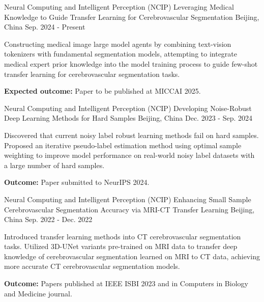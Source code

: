 

\begin{cventries}

  \cventry
  {Neural Computing and Intelligent Perception (NCIP)}
  {Leveraging Medical Knowledge to Guide Transfer Learning for Cerebrovascular Segmentation}
  {Beijing, China}
  {Sep. 2024 - Present}
  {
    \begin{cvitems}
      \item {Constructing medical image large model agents by combining text-vision tokenizers with fundamental segmentation models, attempting to integrate medical expert prior knowledge into the model training process to guide few-shot transfer learning for cerebrovascular segmentation tasks.}
      \item {\textbf{Expected outcome:} Paper to be published at MICCAI 2025.}
    \end{cvitems}
  }

  \cventry
  {Neural Computing and Intelligent Perception (NCIP)}
  {Developing Noise-Robust Deep Learning Methods for Hard Samples}
  {Beijing, China}
  {Dec. 2023 - Sep. 2024}
  {
    \begin{cvitems}
      \item {Discovered that current noisy label robust learning methods fail on hard samples. Proposed an iterative pseudo-label estimation method using optimal sample weighting to improve model performance on real-world noisy label datasets with a large number of hard samples.}
      \item {\textbf{Outcome:} Paper submitted to NeurIPS 2024.}
    \end{cvitems}
  }

  \cventry
  {Neural Computing and Intelligent Perception (NCIP)}
  {Enhancing Small Sample Cerebrovascular Segmentation Accuracy via MRI-CT Transfer Learning}
  {Beijing, China}
  {Sep. 2022 - Dec. 2022}
  {
    \begin{cvitems}
      \item {Introduced transfer learning methods into CT cerebrovascular segmentation tasks. Utilized 3D-UNet variants pre-trained on MRI data to transfer deep knowledge of cerebrovascular segmentation learned on MRI to CT data, achieving more accurate CT cerebrovascular segmentation models.}
      \item {\textbf{Outcome:} Papers published at IEEE ISBI 2023 and in Computers in Biology and Medicine journal.}
    \end{cvitems}
  }


\end{cventries}
